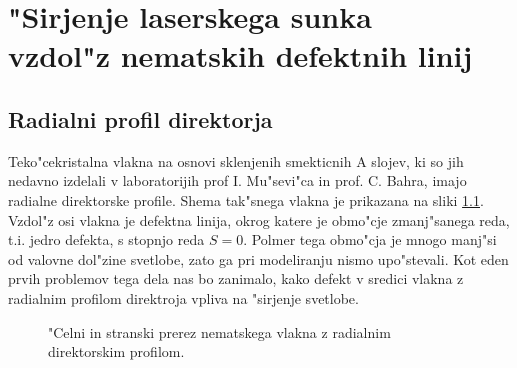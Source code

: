 \documentclass[12pt,twoside,openright,final,a4paper]{report}
\begin{document}
\chapter["Sirjenje laserskega sunka vzdol"z nematskih defektnih linij]{\texorpdfstring{"Sirjenje laserskega sunka \\[.3cm] vzdol"z nematskih defektnih linij}{"Sirjenje laserskega sunka vzdol"z nematskih defektnih linij}}

\section{Radialni profil direktorja}

Teko"cekristalna vlakna na osnovi sklenjenih smekticnih A slojev, ki so jih nedavno izdelali v laboratorijih prof I. Mu"sevi"ca in prof. C. Bahra\cite{peddireddy}, imajo radialne direktorske profile. 
Shema tak"snega vlakna je prikazana na sliki \ref{fig:fibre-radial-profile}. 
Vzdol"z osi vlakna je defektna linija, okrog katere je obmo"cje zmanj"sanega reda, t.i. jedro defekta, s stopnjo reda $S=0$. 
Polmer tega obmo"cja je mnogo manj"si od valovne dol"zine svetlobe, zato ga pri modeliranju nismo upo"stevali. 
Kot eden prvih problemov tega dela nas bo zanimalo, kako defekt v sredici vlakna z radialnim profilom direktroja vpliva na "sirjenje svetlobe. 
\begin{figure}[!ht]
\centering
{}
\caption{"Celni in stranski prerez nematskega vlakna z radialnim direktorskim profilom. }
\label{fig:fibre-radial-profile}
\end{figure}
\end{document}
